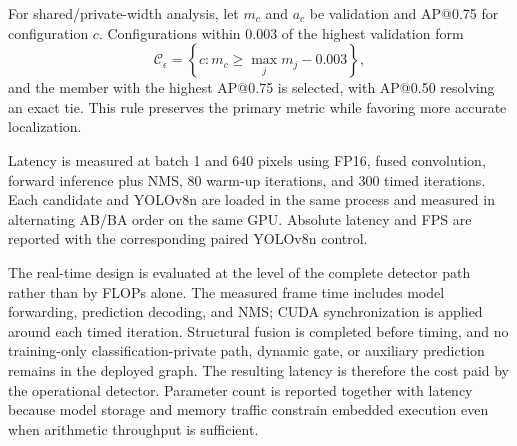 For shared/private-width analysis, let $m_c$ and $a_c$ be validation \mapall{} and AP@0.75 for configuration $c$. Configurations within 0.003 of the highest validation \mapall{} form
\begin{equation}
\mathcal{C}_{\epsilon}=\left\{c:m_c\ge \max_j m_j-0.003\right\},
\label{eq:selection}
\end{equation}
and the member with the highest AP@0.75 is selected, with AP@0.50 resolving an exact tie. This rule preserves the primary metric while favoring more accurate localization.

Latency is measured at batch 1 and 640 pixels using FP16, fused convolution, forward inference plus NMS, 80 warm-up iterations, and 300 timed iterations. Each candidate and YOLOv8n are loaded in the same process and measured in alternating AB/BA order on the same GPU. Absolute latency and FPS are reported with the corresponding paired YOLOv8n control.

The real-time design is evaluated at the level of the complete detector path rather than by FLOPs alone. The measured frame time includes model forwarding, prediction decoding, and NMS; CUDA synchronization is applied around each timed iteration. Structural fusion is completed before timing, and no training-only classification-private path, dynamic gate, or auxiliary prediction remains in the deployed graph. The resulting latency is therefore the cost paid by the operational detector. Parameter count is reported together with latency because model storage and memory traffic constrain embedded execution even when arithmetic throughput is sufficient.
